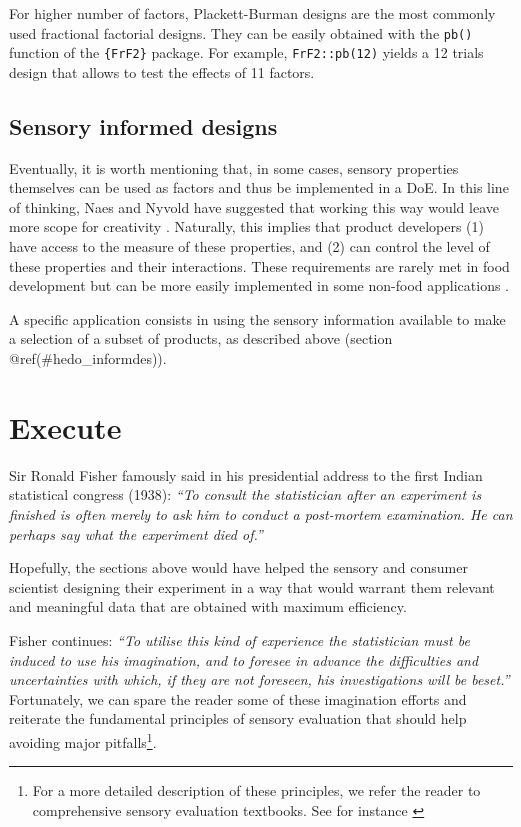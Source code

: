\documentclass[
]{krantz}
\begin{document}
For higher number of factors, Plackett-Burman designs are the most commonly used fractional factorial designs. They can be easily obtained with the \texttt{pb()} function of the \texttt{\{FrF2\}} package. For example, \texttt{FrF2::pb(12)} yields a 12 trials design that allows to test the effects of 11 factors.

\hypertarget{sensory-informed-designs}{%
\subsection{Sensory informed designs}\label{sensory-informed-designs}}

Eventually, it is worth mentioning that, in some cases, sensory properties themselves can be used as factors and thus be implemented in a DoE. In this line of thinking, Naes and Nyvold have suggested that working this way would leave more scope for creativity \citep{Naes2004}. Naturally, this implies that product developers (1) have access to the measure of these properties, and (2) can control the level of these properties and their interactions. These requirements are rarely met in food development but can be more easily implemented in some non-food applications \citep[see for example][]{Petiot2022}.

A specific application consists in using the sensory information available to make a selection of a subset of products, as described above (section @ref(\#hedo\_informdes)).

\hypertarget{execute-1}{%
\section{Execute}\label{execute-1}}

Sir Ronald Fisher famously said in his presidential address to the first Indian statistical congress (1938): \emph{``To consult the statistician after an experiment is finished is often merely to ask him to conduct a post-mortem examination. He can perhaps say what the experiment died of.''}

Hopefully, the sections above would have helped the sensory and consumer scientist designing their experiment in a way that would warrant them relevant and meaningful data that are obtained with maximum efficiency.

Fisher continues: \emph{``To utilise this kind of experience the statistician must be induced to use his imagination, and to foresee in advance the difficulties and uncertainties with which, if they are not foreseen, his investigations will be beset.''}
Fortunately, we can spare the reader some of these imagination efforts and reiterate the fundamental principles of sensory evaluation that should help avoiding major pitfalls\footnote{For a more detailed description of these principles, we refer the reader to comprehensive sensory evaluation textbooks. See for instance \citep{LawlessHeym2010, civille2015, stone2020}}.
\end{document}
